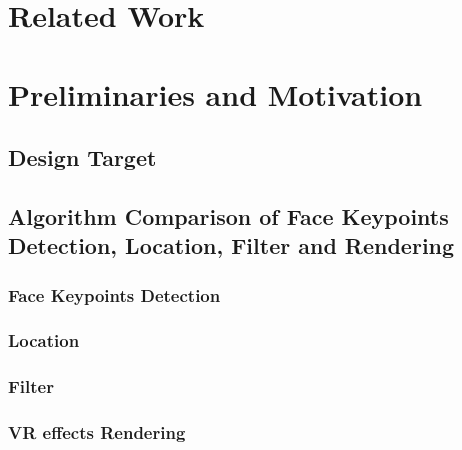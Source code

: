 \section{Related Work}
\lipsum[1]

\section{Preliminaries and Motivation}
\subsection{Design Target}
\lipsum[1]
\subsection{Algorithm Comparison of Face Keypoints Detection, Location, Filter and Rendering}

\lipsum[1]
\subsubsection{Face Keypoints Detection}
\lipsum[1]
\subsubsection{Location}
\lipsum[1]

\subsubsection{Filter}
\lipsum[1]

\subsubsection{VR effects Rendering}
\lipsum[1]


\subsection{}